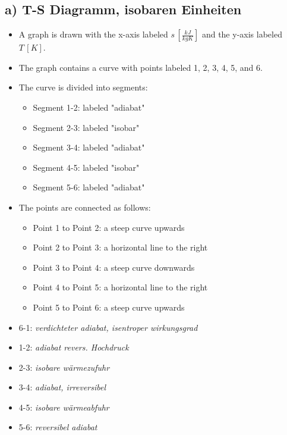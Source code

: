 \subsection*{a) T-S Diagramm, isobaren Einheiten}

\begin{itemize}
    \item A graph is drawn with the x-axis labeled $s \, [\frac{kJ}{kgK}]$ and the y-axis labeled $T \, [K]$.
    \item The graph contains a curve with points labeled 1, 2, 3, 4, 5, and 6.
    \item The curve is divided into segments:
        \begin{itemize}
            \item Segment 1-2: labeled "adiabat"
            \item Segment 2-3: labeled "isobar"
            \item Segment 3-4: labeled "adiabat"
            \item Segment 4-5: labeled "isobar"
            \item Segment 5-6: labeled "adiabat"
        \end{itemize}
    \item The points are connected as follows:
        \begin{itemize}
            \item Point 1 to Point 2: a steep curve upwards
            \item Point 2 to Point 3: a horizontal line to the right
            \item Point 3 to Point 4: a steep curve downwards
            \item Point 4 to Point 5: a horizontal line to the right
            \item Point 5 to Point 6: a steep curve upwards
        \end{itemize}
\end{itemize}

\begin{itemize}
    \item 6-1: \textit{verdichteter adiabat, isentroper wirkungsgrad}
    \item 1-2: \textit{adiabat revers. Hochdruck}
    \item 2-3: \textit{isobare wärmezufuhr}
    \item 3-4: \textit{adiabat, irreversibel}
    \item 4-5: \textit{isobare wärmeabfuhr}
    \item 5-6: \textit{reversibel adiabat}
\end{itemize}